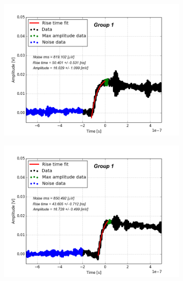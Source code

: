 \documentclass[12pt]{article}
\begin{document}
\begin{figure}[h!]
  \centering
  \begin{subfigure}[t]{0.45\textwidth}
    \centering
    \includegraphics[width=1.1\textwidth]{./graphics/data_0.png}
  \end{subfigure}
  \hfill
  \begin{subfigure}[t]{0.45\textwidth}
    \centering
    \includegraphics[width=1.1\textwidth]{./graphics/data_1.png}
  \end{subfigure}
  \hfill
  \begin{subfigure}[t]{0.45\textwidth}
    \centering

\end{subfigure}
\end{figure}
\end{document}
